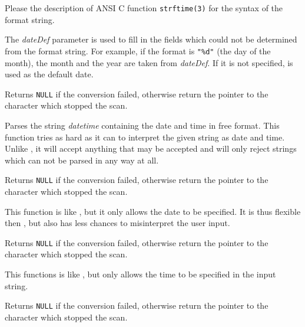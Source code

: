 Please the description of ANSI C function {\tt strftime(3)} for the syntax of
the format string.

The {\it dateDef} parameter is used to fill in the fields which could not be
determined from the format string. For example, if the format is {\tt "\%d"} 
(the day of the month), the month and the year are taken from {\it dateDef}.
If it is not specified,  is used as the
default date.

Returns {\tt NULL} if the conversion failed, otherwise return the pointer to
the character which stopped the scan.

\label{wxdatetimeparsedatetime}


Parses the string {\it datetime} containing the date and time in free format.
This function tries as hard as it can to interpret the given string as date
and time. Unlike , it
will accept anything that may be accepted and will only reject strings which
can not be parsed in any way at all.

Returns {\tt NULL} if the conversion failed, otherwise return the pointer to
the character which stopped the scan.

\label{wxdatetimeparsedate}


This function is like , but it
only allows the date to be specified. It is thus flexible then 
, but also has less chances to
misinterpret the user input.

Returns {\tt NULL} if the conversion failed, otherwise return the pointer to
the character which stopped the scan.

\label{wxdatetimeparsetime}


This functions is like , but
only allows the time to be specified in the input string.

Returns {\tt NULL} if the conversion failed, otherwise return the pointer to
the character which stopped the scan.

